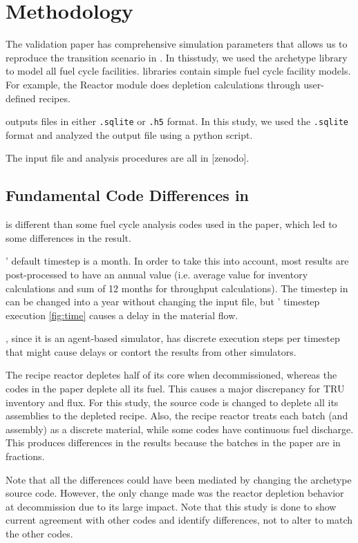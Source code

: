 \section{Methodology}

The validation paper \cite{feng_standardized_2016}
has comprehensive simulation parameters that allows
us to reproduce the transition scenario in \Cyclus.
In thisstudy, we used the \Cycamore \cite{huff_fundamental_2016}
 archetype library to model
all fuel cycle facilities. \Cycamore libraries contain
simple fuel cycle facility models. For example,
the Reactor module does depletion calculations through
user-defined recipes.

\Cyclus outputs files in either \texttt{.sqlite} or
\texttt{.h5} format. In this study, we used the 
\texttt{.sqlite} format and analyzed the output file
using a python script.

The input file and analysis procedures are all in
[zenodo].

\subsection{Fundamental Code Differences in \Cyclus}

\Cyclus is different than some fuel cycle analysis codes
used in the paper, which led to some differences in the result.

\Cyclus' default timestep is a month. In order to take
this into account, most results are post-processed
to have an annual value (i.e. average value for
inventory calculations and sum of 12 months for
throughput calculations). The timestep in \Cyclus
can be changed into a year without changing the input
file, but \Cyclus' timestep execution \ref{fig:time} causes a delay
in the material flow.

\Cyclus, since it is an agent-based simulator, has discrete
execution steps per timestep that might cause delays or contort
the results from other simulators.

The \Cycamore recipe reactor depletes half of its core when decommissioned,
whereas the codes in the paper deplete all its fuel. This causes a major
discrepancy for \gls{TRU} inventory and flux. For this study, the \Cycamore
source code is changed to deplete all its assemblies to the depleted recipe.
Also, the \Cycamore recipe reactor treats each batch (and assembly) as a discrete
material, while some codes have continuous fuel discharge. This produces
differences in the results because the batches in the paper are in fractions.

Note that all the differences could have been mediated by changing the
archetype source code. However, the only change made was the reactor
depletion behavior at decommission due to its large impact. Note that this
study is done to show current \Cyclus agreement with other codes and identify
differences, not to alter \Cyclus to match the other codes.